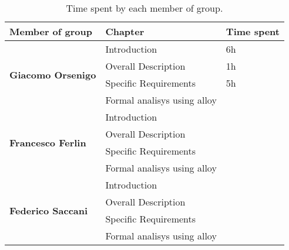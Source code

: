 \begin{table}[H]
    \centering
    \begin{tabular}{|l|l|l|}
        \hline
        \textbf{Member of group }                  & \textbf{Chapter}            & \textbf{Time spent} \\\hline
        \multirow{4}{*}{\textbf{Giacomo Orsenigo}} & Introduction                & 6h                  \\
                                                   & Overall Description         & 1h                  \\
                                                   & Specific Requirements       & 5h                  \\
                                                   & Formal analisys using alloy &                     \\\hline
        \multirow{4}{*}{\textbf{Francesco Ferlin}} & Introduction                &                     \\
                                                   & Overall Description         &                     \\
                                                   & Specific Requirements       &                     \\
                                                   & Formal analisys using alloy &                     \\\hline
        \multirow{4}{*}{\textbf{Federico Saccani}} & Introduction                &                     \\
                                                   & Overall Description         &                     \\
                                                   & Specific Requirements       &                     \\
                                                   & Formal analisys using alloy &                     \\\hline
    \end{tabular}
    \caption{Time spent by each member of group.}
    \label{table:Time spent}
\end{table}
